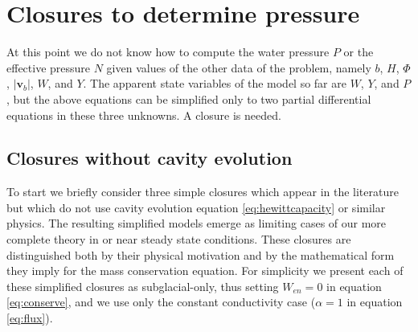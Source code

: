 \documentclass[11pt,final]{amsart}
\newcommand\bv{\mathbf{v}}
\begin{document}
\section{Closures to determine pressure} \label{sec:closures}

At this point we do not know how to compute the water pressure $P$ or the effective pressure $N$ given values of the other data of the problem, namely $b$, $H$, $\Phi$, $|\bv_b|$, $W$, and $Y$.  The apparent state variables of the model so far are $W$, $Y$, and $P$, but the above equations can be simplified only to two partial differential equations in these three unknowns.   A closure is needed.

\subsection*{Closures without cavity evolution}  To start we briefly consider three simple closures which appear in the literature but which do not use cavity evolution equation \eqref{eq:hewittcapacity} or similar physics.  The resulting simplified models emerge as limiting cases of our more complete theory in or near steady state conditions.  These closures are distinguished both by their physical motivation and by the mathematical form they imply for the mass conservation equation.  For simplicity we present each of these simplified closures as subglacial-only, thus setting $W_{en}=0$ in equation \eqref{eq:conserve}, and we use only the constant conductivity case ($\alpha=1$ in equation \eqref{eq:flux}).
\end{document}
